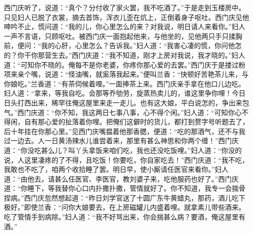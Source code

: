 西门庆听了，说道：“真个？分付收了家火罢，我不吃酒了。”于是走到玉楼房中。只见妇人已脱了衣裳，摘去首饰，浑衣儿歪在炕上，正倒着身子呕吐。西门庆见他呻吟不止，慌问道：“我的儿，你心里怎么的来？对我说，明日请人来看你。”妇人一声不言语，只顾呕吐。被西门庆一面抱起他来，与他坐的，见他两只手只揉胸前，便问：“我的心肝，心里怎么？告诉我。”妇人道：“我害心凄的慌，你问他怎的？你干你那营生去。”西门庆道：“我不知道，刚才上房对我说，我才晓的。”妇人道：“可知你不晓的。俺每不是你老婆，你疼你那心爱的去罢。”西门庆于是搂过粉项来亲个嘴，说道：“怪油嘴，就奚落我起来。”便叫兰香：“快顿好苦艳茶儿来，与你娘吃。”兰香道：“有茶伺候着哩。”一面捧茶上来。西门庆亲手拿在他口儿边吃。妇人道：“拿来，等我自吃。会那等乔劬劳，旋蒸热卖儿的，谁这里争你哩！今日日头打西出来，稀罕往俺这屋里来走一走儿。也有这大娘，平白说怎的，争出来包气。”西门庆道：“你不知，我这两日七事八事，心不得个闲。”妇人道：“可知你心不得闲，自有那心爱的扯落着你哩。把俺们这僻时的货儿，都打到赘字号听题去了，后十年挂在你那心里。”见西门庆嘴揾着他那香腮，便道：“吃的那酒气，还不与我过一边去。人一日黄汤辣水儿谁尝着来，那里有甚么神思和你两个缠！”西门庆道：“你没吃甚么儿？叫丫头拿饭来咱们吃，我也还没吃饭哩。”妇人道：“你没的说，人这里凄疼的了不得，且吃饭！你要吃，你自家吃去！”西门庆道：“我不吃，我敢也不吃了，咱两个收拾睡了罢。明日早，使小厮请任医官来看你。”妇人道：“由他去，请甚么任医官、李医官，教刘婆子来，吃他服药也好了。”西门庆道：“你睡下，等我替你心口内扑撒扑撒，管情就好了。你不知道，我专一会揣骨捏病。”西门庆忽然想起道：“昨日刘学官送了十圆广东牛黄蜡丸，那药，酒儿吃下极好。”即使兰香：“问你大娘要去，在上房磁罐儿内盛着哩。就拿素儿带些酒来。吃了管情手到病除。”妇人道：“我不好骂出来，你会揣甚么病？要酒，俺这屋里有酒。”

